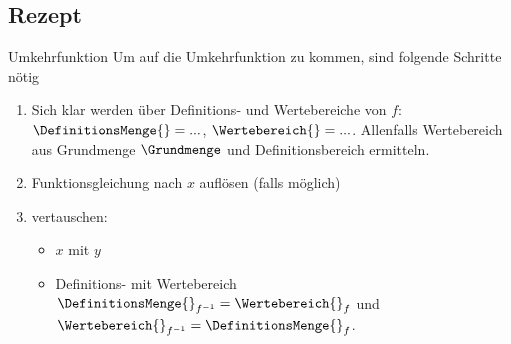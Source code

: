 \subsection{Rezept}
\begin{rezept}{Umkehrfunktion}{}
  Um auf die Umkehrfunktion zu kommen, sind folgende Schritte nötig
  \begin{enumerate}
  \item Sich klar werden über Definitions- und Wertebereiche von $f$:
    $\DefinitionsMenge{} =  ...$, $\Wertebereich{} = ...$. Allenfalls Wertebereich aus Grundmenge $\Grundmenge$ und Definitionsbereich ermitteln.
  \item Funktionsgleichung nach $x$ auf\/lösen (falls möglich)
  \item vertauschen:
    \begin{itemize}
  \item $x$ mit $y$ 
  \item Definitions- mit Wertebereich\\

      $\DefinitionsMenge{}_{f^{-1}} = \Wertebereich{}_f$ und  \\

      $\Wertebereich{}_{f^{-1}} = \DefinitionsMenge{}_f$.
      \end{itemize}
    \end{enumerate} 
  \end{rezept}
\newpage%
